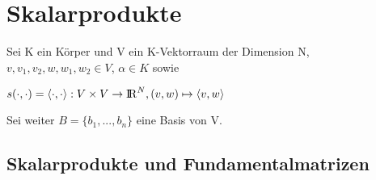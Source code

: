 \documentclass[10pt,a4paper]{article}
\def\realnumbers{{\rm I\!R}}
\begin{document}
	\newpage
	\section{Skalarprodukte}
	\label{sp:sec:skalarprodukte}
	
	Sei K ein Körper und V ein K-Vektorraum der Dimension N, $v, v_1, v_2, w, w_1, w_2 \in V$, $\alpha \in K$ sowie
	\begin{center}
		$s(\cdot,\cdot) = \langle\cdot,\cdot\rangle: V \times V \rightarrow \realnumbers^N, (v, w) \mapsto \langle v, w\rangle$
	\end{center}
	Sei weiter $B = \{b_1, ..., b_n\}$ eine Basis von V.
	
	\subsection{Skalarprodukte und Fundamentalmatrizen}
	\label{sp:sub:skalarprodukte_und_fundamentalmatrizen}
	
\end{document}
